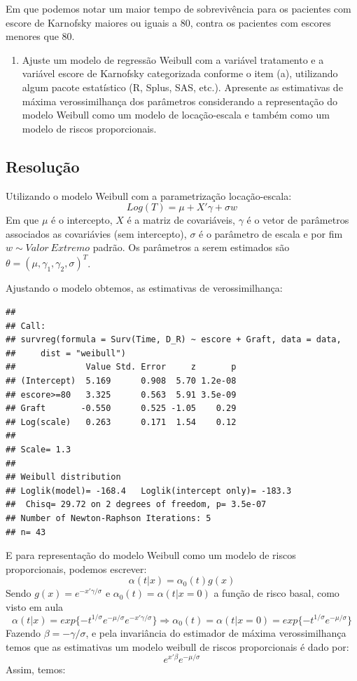\documentclass[]{article}
\providecommand{\tightlist}{%
  \setlength{\itemsep}{0pt}\setlength{\parskip}{0pt}}
\begin{document}
Em que podemos notar um maior tempo de sobrevivência para os pacientes
com escore de Karnofsky maiores ou iguais a 80, contra os pacientes com
escores menores que 80.

\begin{enumerate}
\def\labelenumi{(\alph{enumi})}
\setcounter{enumi}{1}
\tightlist
\item
  Ajuste um modelo de regressão Weibull com a variável tratamento e a
  variável escore de Karnofsky categorizada conforme o item (a),
  utilizando algum pacote estatístico (R, Splus, SAS, etc.). Apresente
  as estimativas de máxima verossimilhança dos parâmetros considerando a
  representação do modelo Weibull como um modelo de locação-escala e
  também como um modelo de riscos proporcionais.
\end{enumerate}

\subsection{Resolução}\label{resolucao-6}

Utilizando o modelo Weibull com a parametrização locação-escala:
\[Log(T)=\mu +X'\gamma+ \sigma w\] Em que \(\mu\) é o intercepto, \(X\)
é a matriz de covariáveis, \(\gamma\) é o vetor de parâmetros associados
as covariávies (sem intercepto), \(\sigma\) é o parâmetro de escala e
por fim \(w \sim Valor \ Extremo\) padrão. Os parâmetros a serem
estimados são \(\theta=(\mu,\gamma_1,\gamma_2,\sigma)^T\).

Ajustando o modelo obtemos, as estimativas de verossimilhança:

\begin{verbatim}
## 
## Call:
## survreg(formula = Surv(Time, D_R) ~ escore + Graft, data = data, 
##     dist = "weibull")
##              Value Std. Error     z       p
## (Intercept)  5.169      0.908  5.70 1.2e-08
## escore>=80   3.325      0.563  5.91 3.5e-09
## Graft       -0.550      0.525 -1.05    0.29
## Log(scale)   0.263      0.171  1.54    0.12
## 
## Scale= 1.3 
## 
## Weibull distribution
## Loglik(model)= -168.4   Loglik(intercept only)= -183.3
##  Chisq= 29.72 on 2 degrees of freedom, p= 3.5e-07 
## Number of Newton-Raphson Iterations: 5 
## n= 43
\end{verbatim}

E para representação do modelo Weibull como um modelo de riscos
proporcionais, podemos escrever: \[\alpha(t|x)=\alpha_0(t)g(x)\] Sendo
\(g(x)=e^{-x'\gamma/\sigma}\) e \(\alpha_0(t)=\alpha(t|x=0)\) a função
de risco basal, como visto em aula
\[\alpha(t|x)=exp \{ -t^{1/\sigma} e^{-\mu/\sigma} e^{-x'\gamma/\sigma} \} \Rightarrow \alpha_0(t)=\alpha(t|x=0)=exp \{ -t^{1/\sigma} e^{-\mu/\sigma} \}\]
Fazendo \(\beta=-\gamma/\sigma\), e pela invariância do estimador de
máxima verossimilhança temos que as estimativas um modelo weibull de
riscos proporcionais é dado por: \[e^{x'\beta}e^{-\mu/\sigma}\] Assim,
temos:
\end{document}
